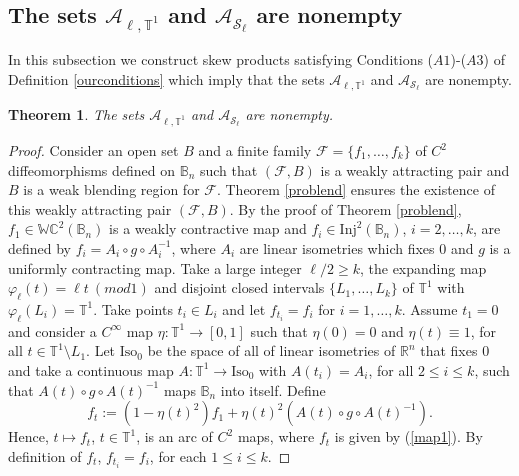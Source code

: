 \documentclass[11pt,reqno]{amsart}
\theoremstyle{plain}
\newtheorem{theorem}{Theorem}[section]
\newtheorem*{theorem A}{Theorem A}
\newtheorem*{theorem B}{Theorem B}
\newtheorem*{theorem C}{Theorem C}
\newtheorem*{theorem 1}{Theorem 1}
\newtheorem*{theorem 2}{Theorem 2}
\newtheorem*{theorem 3}{Theorem 3}
\numberwithin{equation}{section}
\begin{document}
\subsection{The sets $\mathcal{A}_{\ell, \mathbb{T}^1}$ and $\mathcal{A}_{\mathcal{S}_\ell}$ are nonempty}\label{assp}

In this subsection we construct skew products satisfying Conditions ($A1$)-($A3$) of Definition \ref{ourconditions} which imply that the sets $\mathcal{A}_{\ell, \mathbb{T}^1}$ and $\mathcal{A}_{\mathcal{S}_\ell}$ are nonempty.

\begin{theorem}
The sets $\mathcal{A}_{\ell, \mathbb{T}^1}$ and $\mathcal{A}_{\mathcal{S}_\ell}$ are nonempty.
\end{theorem}

\begin{proof}
Consider an open set $B$ and a finite family $\mathcal{F}=\{f_1, \dots, f_k\}$ of $C^2$ diffeomorphisms defined on $\mathbb{B}_n$ such that $(\mathcal{F},B)$ is a weakly attracting pair and $B$ is a weak blending region for $\mathcal{F}$.
 Theorem \ref{problend} ensures the existence of this weakly attracting pair $(\mathcal{F},B)$.
By the proof of Theorem \ref{problend}, $f_1 \in \mathbb{W}\mathbb{C}^2(\mathbb{B}_n)$ is a weakly contractive map and $f_i \in \text{Inj}^2(\mathbb{B}_n)$, $i=2, \dots, k$, are defined by $f_i=A_i \circ g \circ A_i^{-1}$, where $A_i$ are linear isometries which fixes 0 and $g$ is a uniformly contracting map.
Take a large integer $\ell /2 \geq k$, the expanding map $\varphi_\ell(t)=\ell t \ (mod 1)$ and disjoint closed intervals $\{ L_1, \dots, L_k\}$ of $\mathbb{T}^1$ with $\varphi_\ell(L_i)=\mathbb{T}^1$. Take points $t_i \in L_i$ and let $f_{t_i}=f_i$ for $i=1, \dots, k$.
Assume $t_1=0$ and consider a $C^\infty$ map $\eta : \mathbb{T}^1 \to [0, 1]$ such that $\eta (0)=0$ and $\eta(t)\equiv1$, for all $t \in \mathbb{T}^1 \setminus L_1$.
Let $\text{Iso}_0$ be the space of all of linear isometries of $\mathbb{R}^n$ that fixes 0 and take a continuous map $A : \mathbb{T}^1 \to \text{Iso}_0$ with $A(t_i)=A_i$, for all $2 \leq i \leq k$, such that $A(t) \circ g \circ A(t)^{-1}$ maps $\mathbb{B}_n$ into itself.
Define
\begin{equation}\label{map1}
 f_t:=(1- \eta(t)^2)f_1 + \eta(t)^2( A(t) \circ g \circ A(t)^{-1}).
\end{equation}
Hence, $t \mapsto f_t$, $t \in \mathbb{T}^1$, is an arc of $C^2$ maps, where $f_t$ is given by (\ref{map1}). By definition of $f_t$, $f_{t_i}=f_i$, for each $1\leq i \leq k$.

\end{proof}
\end{document}
